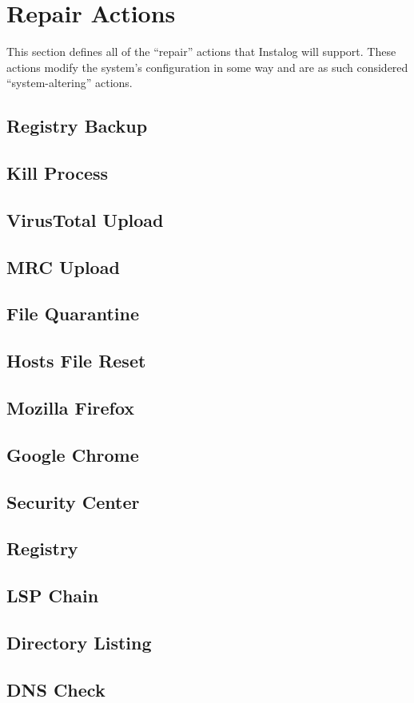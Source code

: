 \section{Repair Actions} \label{sec:repair_actions}
This section defines all of the ``repair'' actions that Instalog will support. 
These actions modify the system's configuration in some way and are as such
considered ``system-altering'' actions. \label{systemaltering}

\subsection{Registry Backup}

\subsection{Kill Process}

\subsection{VirusTotal Upload}

\subsection{MRC Upload}

\subsection{File Quarantine}

\subsection{Hosts File Reset}

\subsection{Mozilla Firefox}

\subsection{Google Chrome}

\subsection{Security Center}

\subsection{Registry}
\subsection{LSP Chain}

\subsection{Directory Listing}

\subsection{DNS Check}
